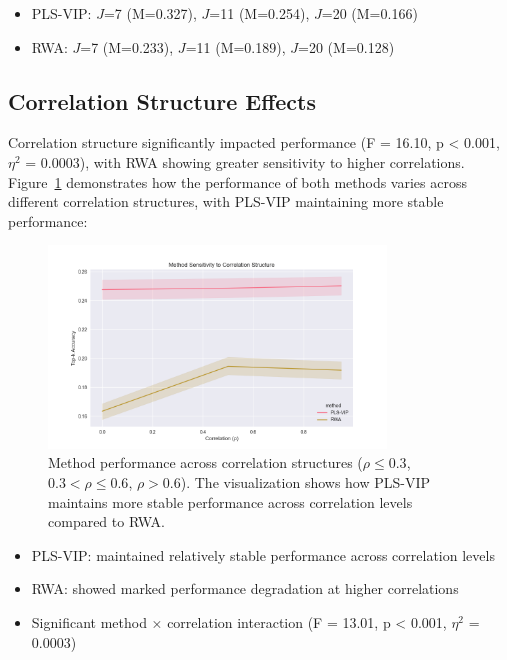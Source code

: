 \begin{itemize}
    \item PLS-VIP: $J$=7 (M=0.327), $J$=11 (M=0.254), $J$=20 (M=0.166)
    \item RWA: $J$=7 (M=0.233), $J$=11 (M=0.189), $J$=20 (M=0.128)
\end{itemize}

\subsection{Correlation Structure Effects}
Correlation structure significantly impacted performance (F = 16.10, p < 0.001, $\eta^2$ = 0.0003), with RWA showing greater sensitivity to higher correlations. Figure~\ref{fig:correlation_effect} demonstrates how the performance of both methods varies across different correlation structures, with PLS-VIP maintaining more stable performance:

\begin{figure}[htbp]
    \centering
    \includegraphics[width=0.8\textwidth]{figures/finding2_correlation.png}
    \caption{Method performance across correlation structures ($\rho \leq 0.3$, $0.3 < \rho \leq 0.6$, $\rho > 0.6$). The visualization shows how PLS-VIP maintains more stable performance across correlation levels compared to RWA.}
    \label{fig:correlation_effect}
\end{figure}

\begin{itemize}
    \item PLS-VIP: maintained relatively stable performance across correlation levels
    \item RWA: showed marked performance degradation at higher correlations
    \item Significant method × correlation interaction (F = 13.01, p < 0.001, $\eta^2$ = 0.0003)
\end{itemize}

